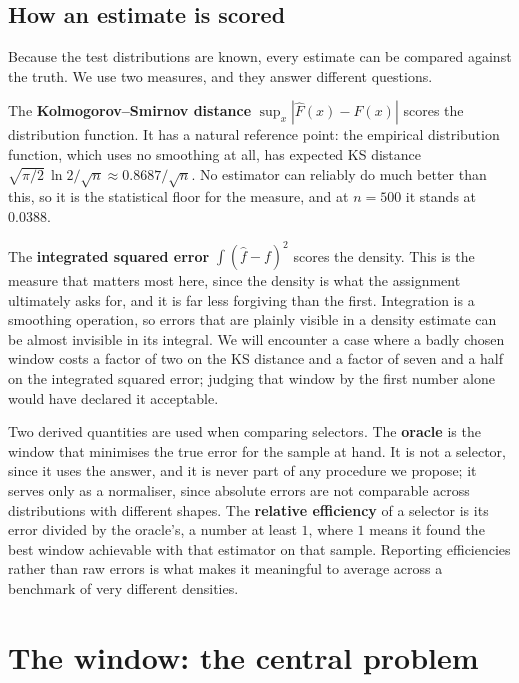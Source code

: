 \documentclass[11pt]{article}
\newcommand{\Fhat}{\widehat{F}}
\newcommand{\fhat}{\widehat{f}}
\begin{document}
\subsection{How an estimate is scored}
\label{sec:scoring}

Because the test distributions are known, every estimate can be compared against the truth.
We use two measures, and they answer different questions.

The \textbf{Kolmogorov--Smirnov distance} $\sup_x |\Fhat(x) - F(x)|$ scores the distribution
function. It has a natural reference point: the empirical distribution function, which uses
no smoothing at all, has expected KS distance $\sqrt{\pi/2}\,\ln 2 / \sqrt{n} \approx
0.8687/\sqrt{n}$. No estimator can reliably do much better than this, so it is the
statistical floor for the measure, and at $n = 500$ it stands at $0.0388$.

The \textbf{integrated squared error} $\int (\fhat - f)^2$ scores the density. This is the
measure that matters most here, since the density is what the assignment ultimately asks for,
and it is far less forgiving than the first. Integration is a smoothing operation, so errors
that are plainly visible in a density estimate can be almost invisible in its integral. We
will encounter a case where a badly chosen window costs a factor of two on the KS distance
and a factor of seven and a half on the integrated squared error; judging that window by the
first number alone would have declared it acceptable.

Two derived quantities are used when comparing selectors. The \textbf{oracle} is the window
that minimises the true error for the sample at hand. It is not a selector, since it uses
the answer, and it is never part of any procedure we propose; it serves only as a
normaliser, since absolute errors are not comparable across distributions with different
shapes. The \textbf{relative efficiency} of a selector is its error divided by the oracle's,
a number at least $1$, where $1$ means it found the best window achievable with that
estimator on that sample. Reporting efficiencies rather than raw errors is what makes it
meaningful to average across a benchmark of very different densities.

\section{The window: the central problem}
\label{sec:window}
\end{document}

